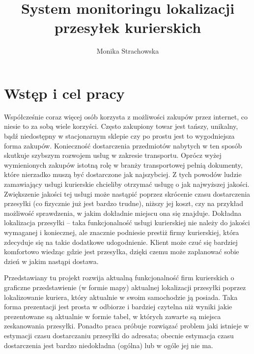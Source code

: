 \documentclass[eng,printmode,oneside]{mgr}
\title{System monitoringu lokalizacji przesyłek kurierskich}
\author{Monika Strachowska}
\begin{document}

\maketitle %


\tableofcontents %

\chapter{Wstęp i cel pracy}

Współcześnie coraz więcej osób korzysta z możliwości zakupów przez internet, co
niesie to za sobą wiele korzyści. Często zakupiony towar jest tańszy, unikalny,
bądź niedostępny w stacjonarnym sklepie czy po prostu jest to wygodniejsza forma
zakupów. Konieczność dostarczenia przedmiotów nabytych w ten sposób skutkuje
szybszym rozwojem usług w zakresie transportu. Oprócz wyżej wymienionych zakupów
istotną rolę w branży transportowej pełnią dokumenty, które nierzadko muszą być
dostarczone jak najszybciej.
Z tych powodów ludzie zamawiający usługi kurierskie chcieliby otrzymać usługę o
jak najwyższej jakości. Zwiększenie jakości tej usługi może nastąpić poprzez
skrócenie czasu dostarczenia przesyłki (co fizycznie już jest bardzo trudne),
niższy jej koszt, czy na przykład możliwość sprawdzenia, w jakim dokładnie
miejscu ona się znajduje. Dokładna lokalizacja przesyłki -- taka funkcjonalność
usługi kurierskiej nie należy do jakości wymaganej i koniecznej, ale znacznie podniesie prestiż firmy
kurierskiej, która zdecyduje się na takie dodatkowe udogodnienie. Klient może
czuć się bardziej komfortowo wiedząc gdzie jest przesyłka, dzięki czemu może
zaplanować sobie dzień w jakim nastąpi dostawa.

Przedstawiany tu projekt rozwija aktualną funkcjonalność firm kurierskich o
graficzne przedstawienie (w formie mapy) aktualnej lokalizacji przesyłki
poprzez lokalizowanie kuriera, który aktualnie w swoim samochodzie ją posiada.
Taka forma prezentacji jest prosta w odbiorze i bardziej czytelna niż wyniki
jakie prezentowane są aktualnie w formie tabel, w których zawarte są miejsca
zeskanowania przesyłki. Ponadto praca próbuje rozwiązać problem jaki istnieje w
estymacji czasu dostarczaniu przesyłki do adresata; obecnie estymacja czasu
dostarczenia jest bardzo niedokładna (ogólna) lub w ogóle jej nie ma.
\end{document}

